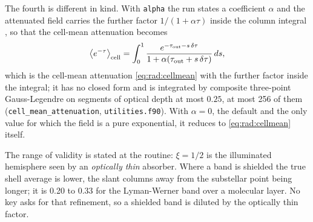 The fourth is different in kind.  With \texttt{alpha} the run states a
coefficient $\alpha$ and the attenuated field carries the further factor
$1/(1+\alpha\tau)$ inside the column integral \citep{Sekiya1980, Odert2020},
so that the cell-mean attenuation becomes
%
\begin{equation}
  \bigl\langle e^{-\tau}\bigr\rangle_{\rm cell}
  = \int_0^1 \frac{e^{-\tau_{\rm out} - s\,\delta\tau}}
                  {1 + \alpha(\tau_{\rm out} + s\,\delta\tau)}\,ds,
  \label{eq:alpha2d}
\end{equation}
%
which is the cell-mean attenuation \eqref{eq:rad:cellmean} with the further
factor inside the integral; it has no closed form and is integrated by
composite three-point Gauss-Legendre on segments of optical depth at most
$0.25$, at most 256 of them (\texttt{cell\_mean\_attenuation},
\texttt{utilities.f90}).  With $\alpha = 0$, the default and the only value for which the field
is a pure exponential, it reduces to \eqref{eq:rad:cellmean} itself.

The range of validity is stated at the routine: $\xi = 1/2$ is the
illuminated hemisphere seen by an \emph{optically thin} absorber.  Where a
band is shielded the true shell average is lower, the slant columns away from
the substellar point being longer; it is 0.20 to 0.33 for the Lyman-Werner
band over a molecular layer.  No key asks for that refinement, so a shielded
band is diluted by the optically thin factor.
